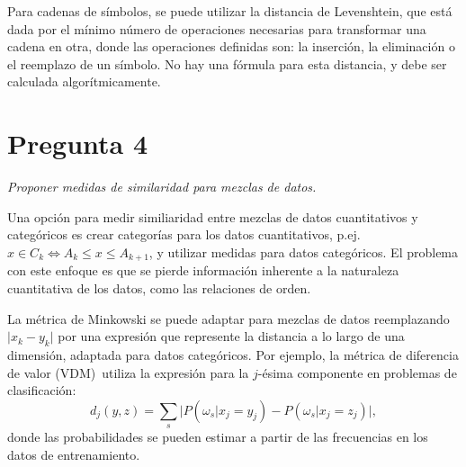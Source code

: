 \documentclass[spanish]{article}
\newcommand{\pregunta}{\textit}
\newcommand{\given}{\vert}
\newcommand{\abs}[1]{\lvert#1\rvert}
\begin{document}
\begin{itemize}
            Para cadenas de símbolos, se puede utilizar la distancia de
            Levenshtein, que está dada por el mínimo número de operaciones
            necesarias para transformar una cadena en otra, donde las
            operaciones definidas son: la inserción, la eliminación o el
            reemplazo de un símbolo.  No hay una fórmula para esta distancia, y
            debe ser calculada algorítmicamente.


    \end{itemize}

\section*{Pregunta 4}
\pregunta{Proponer medidas de similaridad para mezclas de datos.}

Una opción para medir similiaridad entre mezclas de datos cuantitativos y categóricos es crear
categorías para los datos cuantitativos, p.ej. $x\in C_k\iff A_k\leq x\leq A_{k+1}$, y utilizar
medidas para datos categóricos.  El problema con este enfoque es que se pierde información
inherente a la naturaleza cuantitativa de los datos, como las relaciones de orden.

La métrica de Minkowski se puede adaptar para mezclas de datos reemplazando $\abs{x_k - y_k}$ por
una expresión que represente la distancia a lo largo de una dimensión, adaptada para datos
categóricos.  Por ejemplo, la métrica de diferencia de valor (VDM)~\footnotemark utiliza la
expresión para la $j$-ésima componente en problemas de clasificación:
\begin{equation}
    d_j(y, z) = \sum_{s}\bigl\lvert P(\omega_s\given x_j = y_j) -
                                    P(\omega_s\given x_j = z_j)\bigr\rvert,
\end{equation}
donde las probabilidades se pueden estimar a partir de las frecuencias en los datos de
entrenamiento.

\end{document}
